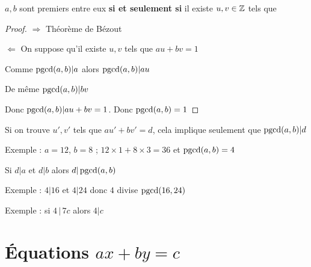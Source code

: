 \begin{frame}

\begin{corollaire}
$a,b$ sont premiers entre eux 
\textbf{si et seulement si} il existe $u,v \in \mathbb{Z}$ tels que
\vspace*{-3ex}
\end{corollaire}

\pause
\medskip

\begin{proof}
$\Rightarrow$ Théorème de Bézout

\pause
\smallskip

$\Leftarrow$ On suppose qu'il existe $u,v$ tels que $au+bv=1$

Comme $\mathop{\text{pgcd}}\nolimits(a,b)|a$ alors $\mathop{\text{pgcd}}\nolimits(a,b)|au$

De même $\mathop{\text{pgcd}}\nolimits(a,b)|bv$

Donc $\mathop{\text{pgcd}}\nolimits(a,b)|au+bv=1$. Donc $\mathop{\text{pgcd}}\nolimits(a,b)=1$
\end{proof}

\pause
\medskip


Si on trouve $u',v'$ tels que $au'+bv'=d$, cela implique seulement que $\mathop{\text{pgcd}}\nolimits(a,b)|d$

\pause

Exemple : $a=12$, $b=8$ ; $12 \times 1 + 8 \times 3 = 36$ et $\mathop{\text{pgcd}}\nolimits(a,b)=4$


\end{frame}



\begin{frame}

\begin{corollaire}
Si $d|a$ et $d|b$ alors $d | \mathop{\text{pgcd}}\nolimits(a,b)$
\end{corollaire}

\pause
\medskip

Exemple : $4|16$ et $4|24$ donc $4$ divise $\mathop{\text{pgcd}}\nolimits(16,24)$


\pause
\bigskip
\bigskip

\begin{corollaire}
\end{corollaire}

\pause
\medskip
Exemple : si $4 \, | \, 7c$ alors $4|c$


\end{frame}

\section{\'Equations $ax+by=c$}


